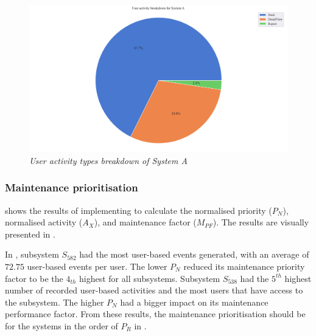 \begin{figure}[!htb]
	\centering %
	\includegraphics[width=0.95\linewidth]{img/ch3/analysis/case_A_breakdown.pdf}
	\caption[User activity types breakdown of System A]
	{\textit{User activity types breakdown of System A}}\label{fig:ch3_caseABreakdown}
\end{figure} 

\subsubsection{Maintenance prioritisation}
 shows the results of implementing  to calculate the normalised priority ($P_N$), normalised activity ($A_X$), and maintenance factor ($M_{PF}$). The results are visually presented in .\par In , subsystem $S_{582}$ had the most user-based events generated, with an average of $72.75$ user-based events per user. The lower $P_N$ reduced its maintenance priority factor to be the $4_{th}$ highest for all subsystems. Subsystem $S_{538}$ had the $5^{th}$ highest number of recorded user-based activities and the most users that have access to the subsystem. The higher $P_N$ had a bigger impact on its maintenance performance factor. From these results, the maintenance prioritisation should be for the systems in the order of $P_R$ in . 

